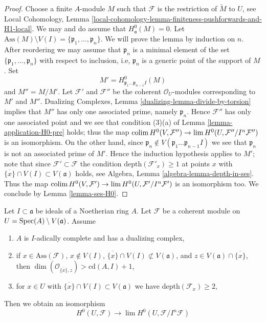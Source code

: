 \begin{proof}
\medskip\noindent
Choose a finite $A$-module $M$ such that $\mathcal{F}$ is the restriction
of $\widetilde{M}$ to $U$, see Local Cohomology, Lemma
\ref{local-cohomology-lemma-finiteness-pushforwards-and-H1-local}.
We may and do assume that $H^0_\mathfrak a(M) = 0$.
Let $\text{Ass}(M) \setminus V(I) = \{\mathfrak p_1, \ldots, \mathfrak p_n\}$.
We will prove the lemma by induction on $n$. After reordering we
may assume that $\mathfrak p_n$ is a minimal element of the set
$\{\mathfrak p_1, \ldots, \mathfrak p_n\}$ with respect to inclusion, i.e,
$\mathfrak p_n$ is a generic point of the support of $M$.
Set
$$
M' = H^0_{\mathfrak p_1 \ldots \mathfrak p_{n - 1} I}(M)
$$
and $M'' = M/M'$. Let $\mathcal{F}'$ and $\mathcal{F}''$ be the
coherent $\mathcal{O}_U$-modules corresponding to $M'$ and $M''$.
Dualizing Complexes, Lemma \ref{dualizing-lemma-divide-by-torsion}
implies that $M''$ has only one associated prime, namely $\mathfrak p_n$.
Hence $\mathcal{F}''$ has only one associated point and
we see that condition (3)(a) of Lemma \ref{lemma-application-H0-pre} holds;
thus the map $\mathop{\mathrm{colim}}\nolimits H^0(V, \mathcal{F}'')
\to \mathop{\mathrm{lim}}\nolimits H^0(U, \mathcal{F}''/I^n\mathcal{F}'')$ is an isomorphism.
On the other hand, since
$\mathfrak p_n \not \in V(\mathfrak p_1 \ldots \mathfrak p_{n - 1} I)$
we see that $\mathfrak p_n$ is not an associated prime of $M'$.
Hence the induction hypothesis applies to $M'$; note
that since $\mathcal{F}' \subset \mathcal{F}$
the condition $\text{depth}(\mathcal{F}'_x) \geq 1$ at points $x$ with
$\overline{\{x\}} \cap V(I) \subset V(\mathfrak a)$ holds, see
Algebra, Lemma \ref{algebra-lemma-depth-in-ses}.
Thus the map
$\mathop{\mathrm{colim}}\nolimits H^0(V, \mathcal{F}')
\to \mathop{\mathrm{lim}}\nolimits H^0(U, \mathcal{F}'/I^n\mathcal{F}')$ is an isomorphism too.
We conclude by Lemma \ref{lemma-ses-H0}.
\end{proof}

\begin{lemma}
\label{lemma-application-H0}
Let $I \subset \mathfrak a$ be ideals of a Noetherian ring $A$.
Let $\mathcal{F}$ be a coherent module on
$U = \mathop{\mathrm{Spec}}(A) \setminus V(\mathfrak a)$.
Assume
\begin{enumerate}
\item $A$ is $I$-adically complete and has a dualizing complex,
\item if $x \in \text{Ass}(\mathcal{F})$, $x \not \in V(I)$,
$\overline{\{x\}} \cap V(I) \not \subset V(\mathfrak a)$, and
$z \in V(\mathfrak a) \cap \overline{\{x\}}$, then
$\dim(\mathcal{O}_{\overline{\{x\}}, z}) > \text{cd}(A, I) + 1$,
\item for $x \in U$ with $\overline{\{x\}} \cap V(I) \subset V(\mathfrak a)$
we have $\text{depth}(\mathcal{F}_x) \geq 2$,
\end{enumerate}
Then we obtain an isomorphism
$$
H^0(U, \mathcal{F})
\longrightarrow
\lim H^0(U, \mathcal{F}/I^n\mathcal{F})
$$
\end{lemma}

